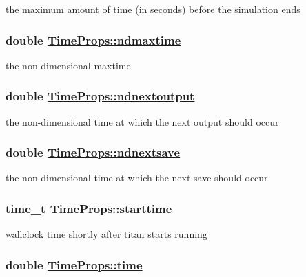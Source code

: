 the maximum amount of time (in seconds) before the simulation ends 

\hypertarget{structTimeProps_o3}{
\subsubsection[ndmaxtime]{\setlength{\rightskip}{0pt plus 5cm}double \hyperlink{structTimeProps_o3}{Time\-Props::ndmaxtime}}}
\label{structTimeProps_o3}


the non-dimensional maxtime 

\hypertarget{structTimeProps_o8}{
\subsubsection[ndnextoutput]{\setlength{\rightskip}{0pt plus 5cm}double \hyperlink{structTimeProps_o8}{Time\-Props::ndnextoutput}}}
\label{structTimeProps_o8}


the non-dimensional time at which the next output should occur 

\hypertarget{structTimeProps_o9}{
\subsubsection[ndnextsave]{\setlength{\rightskip}{0pt plus 5cm}double \hyperlink{structTimeProps_o9}{Time\-Props::ndnextsave}}}
\label{structTimeProps_o9}


the non-dimensional time at which the next save should occur 

\hypertarget{structTimeProps_o14}{
\subsubsection[starttime]{\setlength{\rightskip}{0pt plus 5cm}time\_\-t \hyperlink{structTimeProps_o14}{Time\-Props::starttime}}}
\label{structTimeProps_o14}


wallclock time shortly after titan starts running 

\hypertarget{structTimeProps_o11}{
\subsubsection[time]{\setlength{\rightskip}{0pt plus 5cm}double \hyperlink{structTimeProps_o11}{Time\-Props::time}}}
\label{structTimeProps_o11}


